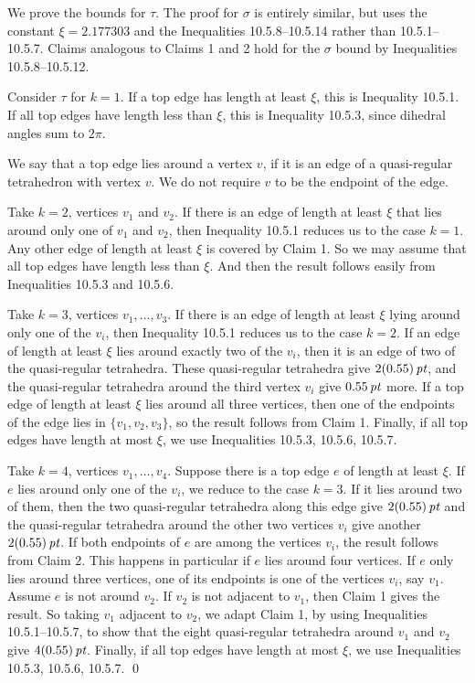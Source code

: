 We prove the bounds for $\tau$.  The proof for $\sigma$ is entirely
similar, but uses the constant $\xi=2.177303$ and the
Inequalities 10.5.8--10.5.14 rather than 10.5.1--10.5.7.
Claims analogous to Claims 1 and 2 hold for the $\sigma$ bound
by Inequalities 10.5.8--10.5.12.

Consider $\tau$ for $k=1$.  If a top edge has length at least $\xi$, this
is Inequality 10.5.1.  If all top edges have length less than $\xi$,
this is Inequality 10.5.3, since dihedral angles sum to $2\pi$.

We say that a top edge lies around a vertex $v$, if it is an
edge of a quasi-regular tetrahedron with vertex $v$.
We do not require $v$ to be the endpoint of the edge.

Take $k=2$, vertices $v_1$ and $v_2$. 
If there is an edge of length at least $\xi$ that
lies around only one of $v_1$ and $v_2$, then Inequality 10.5.1
reduces us to the case $k=1$.  Any other edge of length at
least $\xi$ is covered by Claim 1.  So we may assume that all
top edges have length less than $\xi$.  And then the result
follows easily from Inequalities 10.5.3 and 10.5.6.

Take $k=3$, vertices $v_1,\ldots,v_3$.  If there is an
edge of length at least $\xi$ lying around only one of the $v_i$,
then Inequality 10.5.1 reduces us to the case $k=2$.
If an edge of length at least $\xi$
lies around exactly two of the $v_i$, then it
is an edge of two of the quasi-regular tetrahedra.  These
quasi-regular tetrahedra give $2(0.55)\,\hbox{\it pt}$, and the quasi-regular
tetrahedra around the third vertex $v_i$ give $0.55\,\hbox{\it pt}$ more.
If a top edge of length at least $\xi$ lies around all three
vertices, then one of the endpoints of the edge
lies in $\{v_1,v_2,v_3\}$, so the result follows from Claim 1.
Finally, if all top edges have length at most $\xi$, we use
Inequalities 10.5.3, 10.5.6, 10.5.7.

Take $k=4$, vertices $v_1,\ldots,v_4$.  Suppose there
is a top edge $e$ of length at least $\xi$.  If $e$ 
lies around only one of the $v_i$, we
reduce to the case $k=3$.  If it lies around two of them, then
the two quasi-regular tetrahedra along this edge give $2(0.55)\,\hbox{\it pt}$
and the quasi-regular tetrahedra around the other two vertices
$v_i$ give another $2(0.55)\,\hbox{\it pt}$.  If both endpoints of $e$ are
among the vertices $v_i$, the result follows from Claim 2.  This
happens in particular if $e$ lies around four vertices.  If $e$
only lies around three vertices, one of its endpoints is one of
the vertices $v_i$, say $v_1$.  Assume $e$ is not around $v_2$.
If $v_2$ is not adjacent to $v_1$, then Claim 1 gives the
result.  So taking $v_1$ adjacent to $v_2$, we adapt Claim 1,
by using Inequalities 10.5.1--10.5.7, to show that the eight quasi-regular
tetrahedra around $v_1$ and $v_2$ give $4(0.55)\,\hbox{\it pt}$.
Finally, if all top edges have length at most $\xi$, we use
Inequalities 10.5.3, 10.5.6, 10.5.7.
\qed
\enddemo

